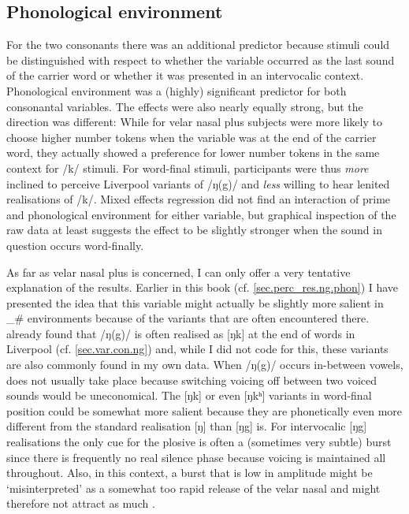 		\subsection{Phonological environment}

For the two consonants there was an additional predictor because stimuli could be distinguished with respect to whether the variable occurred as the last sound of the carrier word or whether it was presented in an intervocalic context.
Phonological environment was a (highly) significant predictor for both consonantal variables.
The effects were also nearly equally strong, but the direction was different: While for velar nasal plus subjects were more likely to choose higher number tokens when the variable was at the end of the carrier word, they actually showed a preference for lower number tokens in the same context for /k/ stimuli.
For word-final stimuli, participants were thus \emph{more} inclined to perceive Liverpool variants of /ŋ(g)/ and \emph{less} willing to hear lenited realisations of /k/.
Mixed effects regression did not find an interaction of prime and phonological environment for either variable, but graphical inspection of the raw data at least suggests the  effect to be slightly stronger when the sound in question occurs word-finally.

As far as velar nasal plus is concerned, I can only offer a very tentative explanation of the results.
Earlier in this book (cf. \ref{sec.perc_res.ng.phon}) I have presented the idea that this variable might actually be slightly more salient in \_\# environments because of the variants that are often encountered there.
\textcite{knowles1973} already found that /ŋ(g)/ is often realised as [ŋk] at the end of words in Liverpool (cf. \ref{sec.var.con.ng}) and, while I did not code for this, these variants are also commonly found in my own data.
When /ŋ(g)/ occurs in-between vowels,  does not usually take place because switching voicing off between two voiced sounds would be uneconomical.
The [ŋk] or even [ŋkʰ] variants in word-final position could be somewhat more salient because they are phonetically even more different from the standard realisation [ŋ] than [ŋg] is.
For intervocalic [ŋg] realisations the only cue for the plosive is often a (sometimes very subtle) burst since there is frequently no real silence phase because voicing is maintained all throughout.
Also, in this context, a burst that is low in amplitude might be `misinterpreted' as a somewhat too rapid release of the velar nasal and might therefore not attract as much .

